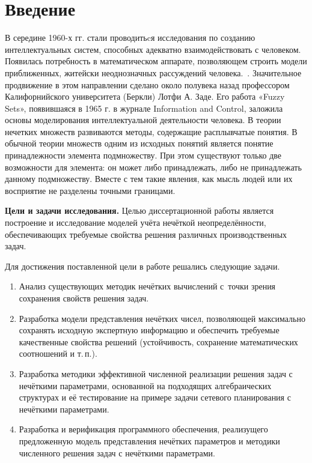 \chapter*{Введение}

В середине 1960-х гг. стали проводитьcя исследования по созданию интеллектуальных систем, способных адекватно взаимодействовать с человеком. Появилась потребность в математическом аппарате, позволяющем строить модели приближенных, житейски неоднозначных рассуждений человека.~\cite{Ukhobotov_Chosen}. Значительное продвижение в этом направлении сделано около полувека назад профессором Калифорнийского университета (Беркли) Лотфи А. Заде. Его работа «Fuzzy Sets», появившаяся в 1965 г. в журнале Information and Control, заложила основы моделирования интеллектуальной деятельности человека.
В теории нечетких множеств развиваются методы, содержащие расплывчатые понятия. В обычной теории множеств одним из исходных понятий является понятие принадлежности элемента подмножеству. При этом существуют только две возможности для элемента: он может либо принадлежать, либо не принадлежать данному подмножеству. Вместе с тем такие явления, как мысль людей или их восприятие не разделены точными границами.

\textbf{Цели и задачи исследования.} Целью диссертационной работы является построение и исследование моделей учёта нечёткой неопределённости, обеспечивающих требуемые свойства решения различных производственных задач.

Для достижения поставленной цели в работе решались следующие задачи.
\begin{enumerate}
  \item Анализ существующих методик нечётких вычислений с~точки зрения сохранения свойств решения задач.
  \item Разработка модели представления нечётких чисел, позволяющей максимально сохранять исходную экспертную информацию и обеспечить требуемые качественные свойства решений (устойчивость, сохранение математических соотношений и т.\,п.).
  \item Разработка методики эффективной численной реализации решения задач с нечёткими параметрами, основанной на подходящих алгебраических структурах и её тестирование на примере задачи сетевого планирования с нечёткими параметрами.
  \item Разработка и верификация программного обеспечения, реализущего предложенную модель представления нечётких параметров и методики численного решения задач с нечёткими параметрами.
\end{enumerate}

